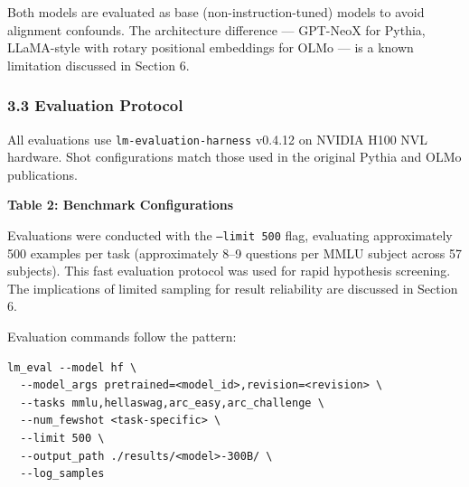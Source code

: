 Both models are evaluated as base (non-instruction-tuned) models to avoid alignment confounds. The architecture difference --- GPT-NeoX for Pythia, LLaMA-style with rotary positional embeddings for OLMo --- is a known limitation discussed in Section 6.

\subsubsection{3.3 Evaluation Protocol}

All evaluations use \texttt{lm-evaluation-harness} v0.4.12 \citep{Gao2024LMEval} on NVIDIA H100 NVL hardware. Shot configurations match those used in the original Pythia and OLMo publications.

\textbf{Table 2: Benchmark Configurations}

\begin{table}[htbp]
\centering
{}
\end{table}

Evaluations were conducted with the \texttt{--limit 500} flag, evaluating approximately 500 examples per task (approximately 8--9 questions per MMLU subject across 57 subjects). This fast evaluation protocol was used for rapid hypothesis screening. The implications of limited sampling for result reliability are discussed in Section 6.

Evaluation commands follow the pattern:

\begin{verbatim}
lm_eval --model hf \
  --model_args pretrained=<model_id>,revision=<revision> \
  --tasks mmlu,hellaswag,arc_easy,arc_challenge \
  --num_fewshot <task-specific> \
  --limit 500 \
  --output_path ./results/<model>-300B/ \
  --log_samples
\end{verbatim}


